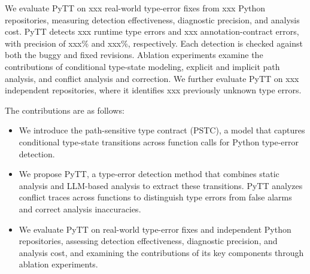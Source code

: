 We evaluate PyTT on xxx real-world type-error fixes from xxx Python
repositories, measuring detection effectiveness, diagnostic precision,
and analysis cost. PyTT detects xxx runtime type errors and xxx
annotation-contract errors, with precision of xxx\% and xxx\%, respectively.
Each detection is checked against both the buggy and fixed revisions.
Ablation experiments examine the contributions of conditional type-state
modeling, explicit and implicit path analysis, and conflict analysis and
correction. We further evaluate PyTT on xxx independent repositories,
where it identifies xxx previously unknown type errors.

The contributions are as follows:
\begin{itemize}
  \item We introduce the path-sensitive type contract (PSTC), a model
  that captures conditional type-state transitions across function calls
  for Python type-error detection.
  \item We propose PyTT, a type-error detection method that combines
  static analysis and LLM-based analysis to extract these transitions.
  PyTT analyzes conflict traces across functions to distinguish type
  errors from false alarms and correct analysis inaccuracies.
  \item We evaluate PyTT on real-world type-error fixes and independent
  Python repositories, assessing detection effectiveness, diagnostic
  precision, and analysis cost, and examining the contributions of its
  key components through ablation experiments.
\end{itemize}
